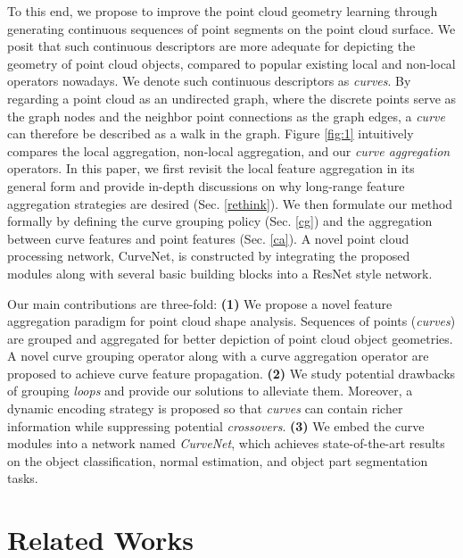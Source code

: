 \documentclass[10pt,twocolumn,letterpaper]{article}
\theoremstyle{definition}
\begin{document}
To this end, we propose to improve the point cloud geometry learning through generating continuous sequences of point segments on the point cloud surface. We posit that such continuous descriptors are more adequate for depicting the geometry of point cloud objects, compared to popular existing local and non-local operators nowadays. We denote such continuous descriptors as \textit{curves}. By regarding a point cloud as an undirected graph, where the discrete points serve as the graph nodes and the neighbor point connections as the graph edges, a \textit{curve} can therefore be described as a walk in the graph. Figure \ref{fig:1} intuitively compares the local aggregation, non-local aggregation, and our \textit{curve aggregation} operators. In this paper, we first revisit the local feature aggregation in its general form and provide in-depth discussions on why long-range feature aggregation strategies are desired (Sec. \ref{rethink}). We then formulate our method formally by defining the curve grouping policy (Sec. \ref{cg}) and the aggregation between curve features and point features (Sec. \ref{ca}). A novel point cloud processing network, CurveNet, is constructed by integrating the proposed modules along with several basic building blocks into a ResNet \cite{he2016deep} style network. 







Our main contributions are three-fold: \textbf{(1)} We propose a novel feature aggregation paradigm for point cloud shape analysis. Sequences of points (\textit{curves}) are grouped and aggregated for better depiction of point cloud object geometries. A novel curve grouping operator along with a curve aggregation operator are proposed to achieve curve feature propagation. \textbf{(2)} We study potential drawbacks of grouping \textit{loops} and provide our solutions to alleviate them. Moreover, a dynamic encoding strategy is proposed so that \textit{curves} can contain richer information while suppressing potential \textit{crossovers}. \textbf{(3)} We embed the curve modules into a network named \textit{CurveNet}, which achieves state-of-the-art results on the object classification, normal estimation, and object part segmentation tasks. 



\section{Related Works}
\end{document}
